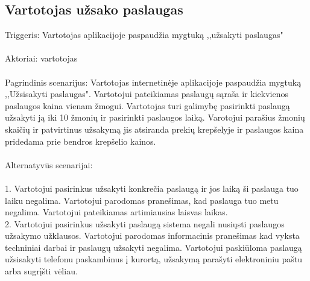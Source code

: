 \documentclass[oneside]{VUMIFPSkursinis}
\begin{document}
\subsection{Vartotojas užsako paslaugas}
	Triggeris: Vartotojas aplikacijoje paspaudžia mygtuką ,,užsakyti paslaugas" \\ \\
	Aktoriai: vartotojas \\ \\
	Pagrindinis scenarijus: Vartotojas internetinėje aplikacijoje paspaudžia mygtuką ,,Užsisakyti paslaugas". Vartotojui pateikiamas paslaugų sąraša ir kiekvienos paslaugos kaina vienam žmogui. Vartotojas turi galimybę pasirinkti paslaugą užsakyti ją iki 10 žmonių ir pasirinkti paslaugos laiką. Varotojui parašius žmonių skaičių ir patvirtinus užsakymą jis atsiranda prekių krepšelyje ir paslaugos kaina pridedama prie bendros krepšelio kainos. \\ \\
	Alternatyvūs scenarijai:  \\ \\
1. Vartotojui pasirinkus užsakyti konkrečia paslaugą ir jos laiką ši paslauga tuo laiku negalima. Vartotojui parodomas pranešimas, kad paslauga tuo metu negalima. Vartotojui pateikiamas artimiausias laisvas laikas. \\ 
2. Vartotojui pasirinkus užsakyti paslaugą sistema negali nusiųsti paslaugos užsakymo užklausos. Vartotojui parodomas informacinis pranešimas kad vyksta techniniai darbai ir paslaugų užsakyti negalima. Vartotojui paskiūloma paslaugą užsisakyti telefonu paskambinus į kurortą, užsakymą parašyti elektroniniu paštu arba sugrįšti vėliau.\\ \\
\end{document}
